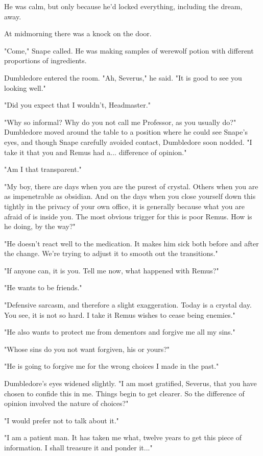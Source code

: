\documentclass[a4paper,11pt]{article}
\begin{document}
He was calm, but only because he'd locked everything, including the dream, away.

At midmorning there was a knock on the door.

"Come," Snape called. He was making samples of werewolf potion with different proportions of ingredients.

Dumbledore entered the room. "Ah, Severus," he said. "It is good to see you looking well."

"Did you expect that I wouldn't, Headmaster."

"Why so informal? Why do you not call me Professor, as you usually do?" Dumbledore moved around the table to a position where he could see Snape's eyes, and though Snape carefully avoided contact, Dumbledore soon nodded. "I take it that you and Remus had a... difference of opinion."

"Am I that transparent."

"My boy, there are days when you are the purest of crystal. Others when you are as impenetrable as obsidian. And on the days when you close yourself down this tightly in the privacy of your own office, it is generally because what you are afraid of is inside you. The most obvious trigger for this is poor Remus. How is he doing, by the way?"

"He doesn't react well to the medication. It makes him sick both before and after the change. We're trying to adjust it to smooth out the transitions."

"If anyone can, it is you. Tell me now, what happened with Remus?"

"He wants to be friends."

"Defensive sarcasm, and therefore a slight exaggeration. Today is a crystal day. You see, it is not so hard. I take it Remus wishes to cease being enemies."

"He also wants to protect me from dementors and forgive me all my sins."

"Whose sins do you not want forgiven, his or yours?"

"He is going to forgive me for the wrong choices I made in the past."

Dumbledore's eyes widened slightly. "I am most gratified, Severus, that you have chosen to confide this in me. Things begin to get clearer. So the difference of opinion involved the nature of choices?"

"I would prefer not to talk about it."

"I am a patient man. It has taken me what, twelve years to get this piece of information. I shall treasure it and ponder it..."
\end{document}

